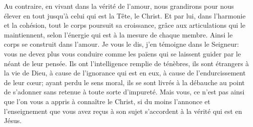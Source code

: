 Au contraire, en vivant dans la vérité de l’amour,
	nous grandirons pour nous élever en tout
	jusqu’à celui qui est la Tête, le Christ.
Et par lui, dans l’harmonie et la cohésion,
	tout le corps poursuit sa croissance,
	grâce aux articulations qui le maintiennent,
	selon l’énergie qui est à la mesure de chaque membre.
Ainsi le corps se construit dans l’amour.
Je vous le dis, j’en témoigne dans le Seigneur:
	vous ne devez plus vous conduire comme les païens
	qui se laissent guider par le néant de leur pensée.
Ils ont l’intelligence remplie de ténèbres,
	ils sont étrangers à la vie de Dieu,
	à cause de l’ignorance qui est en eux,
	à cause de l’endurcissement de leur cœur;
	ayant perdu le sens moral, ils se sont livrés à la débauche
	au point de s’adonner sans retenue à toute sorte d’impureté.
Mais vous, ce n’est pas ainsi que l’on vous a appris à connaître le Christ,
	si du moins l’annonce et l’enseignement que vous avez reçus à son sujet
	s’accordent à la vérité qui est en Jésus.
